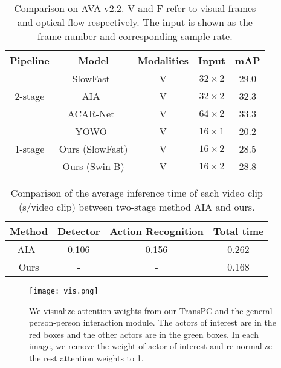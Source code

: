 \documentclass[final]{cvpr}
\begin{document}
\begin{table} [t]
\begin{center}
\small
\begin{tabular}{c|c|c|c|c}
\toprule
Pipeline & Model & Modalities & Input & mAP  \\
\midrule
\multirow{3}{3em}{2-stage}
& SlowFast~\cite{feichtenhofer2019slowfast} & V & $32\times 2$ & 29.0 \\
& AIA~\cite{DBLP:conf/eccv/TangXMPL20} & V & $32\times 2$ & 32.3 \\
& ACAR-Net~\cite{DBLP:conf/cvpr/PanCSLS021} & V & $64\times 2$ & 33.3 \\
\midrule
\multirow{3}{3em}{1-stage}
& YOWO~\cite{kopuklu2019yowo}& V & $16\times 1$ & 20.2 \\
& Ours (SlowFast) & V & $16\times 2$ & 28.5 \\
& Ours (Swin-B) & V & $16\times 2$ & 28.8 \\
\bottomrule
\end{tabular}
\end{center}
\vspace{-5mm}
\caption{Comparison on AVA v2.2. V and F refer to visual frames and optical flow respectively. The input is shown as the frame number and corresponding sample rate.}
\vspace{-1mm}
\label{ava2.2}
\end{table}

\begin{table} [t]
\begin{center}
\small
\begin{tabular}{c|c|c|c}
\toprule
Method & Detector & Action Recognition & Total time  \\
\midrule
AIA~\cite{DBLP:conf/eccv/TangXMPL20} & 0.106 & 0.156 & 0.262\\
\midrule
Ours & -& -& 0.168 \\
\bottomrule
\end{tabular}
\end{center}
\vspace{-5mm}
\caption{Comparison of the average inference time of each video clip (s/video clip) between two-stage method AIA and ours.}
\vspace{-2mm}
\label{speed}
\end{table}

\begin{figure}[t]
\texttt{[image: vis.png]}
\centering
\caption{We visualize attention weights from our TransPC and the general person-person interaction module. The actors of interest are in the red boxes and the other actors are in the green boxes. In each image, we remove the weight of actor of interest and re-normalize the rest attention weights to 1. }
\label{vis}
\vspace{-6mm}
\end{figure}
\end{document}

